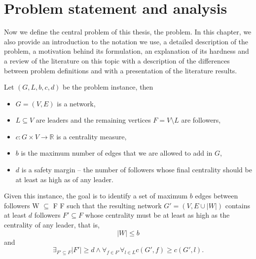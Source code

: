 \chapter{Problem statement and analysis}\label{chapter:ProblemStatement}

Now we define the central problem of this thesis, the \HL problem.
In this chapter, we also provide an introduction to the notation we use,
a detailed description of the problem, a motivation behind its formulation, an explanation of its hardness
and a review of the literature on this topic with a description of the differences between problem definitions
and with a presentation of the literature results.


\vspace{2.5mm}
\begin{tcolorbox}[
    enhanced, skin=enhancedmiddle,
    arc=0pt, outer arc=0pt,
    frame hidden, %
    colback=backgroundgray!10,
    boxsep=0mm,
    borderline={0.75mm}{0mm}{decoration}, borderline={0.75mm}{0.75mm}{backgroundgray},
]
\begin{definition}[\HL]\label{def:HL}
    Let $(G, L, b, c, d)$ be the problem instance, then
    \begin{itemize}
        \item $G = (V, E)$ is a network,
        \item $L \subseteq V$ are leaders and the remaining vertices $F = V \setminus L$ are followers,
        \item $c : G \times V \rightarrow \mathbb{R}$ is a centrality measure,
        \item $b$ is the maximum number of edges that we are allowed to add in $G$,
        \item $d$ is a safety margin -- the number of followers whose final centrality should be at least as high as of any leader.
    \end{itemize}
    Given this instance, the goal is to identify a set of maximum $b$ edges between followers W $\subseteq$ F {\texttimes} F
    such that the resulting network $G' = (V, E \cup |W|)$ contains at least $d$ followers $F' \subseteq F$
    whose centrality must be at least as high as the centrality of any leader, that is,
    $$|W| \leq b$$
    and
    $$\exists_{F' \subseteq F} |F'| \geq d \wedge \forall_{f \in F'} \forall_{l \in L} c(G', f) \geq c(G', l).$$
\end{definition}
\end{tcolorbox}
\vspace{2.5mm}

